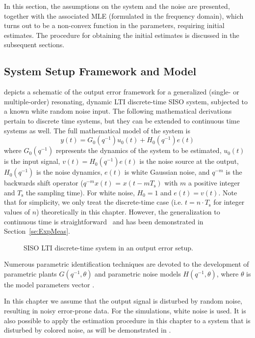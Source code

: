 In this section, the assumptions on the system and the noise are presented, together with the associated MLE (formulated in the frequency domain), which turns out to be a non-convex function in the parameters, requiring initial estimates. The procedure for obtaining the initial estimates is discussed in the subsequent sections.

\subsection{System Setup Framework and Model}
 depicts a schematic of the output error framework for  a generalized (single- or multiple-order) resonating, dynamic LTI discrete-time SISO system, subjected to a known white random noise input. The following mathematical derivations pertain to discrete time systems, but they can be extended to continuous time systems as well. The full mathematical model of the system is
\begin{equation}\label{lpmtd1}
y(t)=G_0(q^{-1})u_0(t)+H_0(q^{-1})e(t)
\end{equation}
where $G_0(q^{-1})$ represents the dynamics of the system to be estimated, $u_0(t)$ is the input signal, $v(t)= H_0(q^{-1})e(t)$ is the noise source at the output, $H_0(q^{-1})$ is the noise dynamics, 
$e(t)$ is white Gaussian noise, and $q^{-m}$ is the backwards shift operator ($q^{-m}x(t)$ = $x(t-mT_{\mathrm{s}})$  with $m$ a positive integer and $T_{\mathrm{s}}$ the sampling time).
For white noise, $H_0 = 1$ and $e(t) = v(t)$.
Note that for simplicity, we only treat the discrete-time case (i.e. $t = n \cdot T_{\mathrm{s}}$ for integer values of $n$) theoretically in this chapter.
However, the generalization to continuous time is straightforward~\citep[Chapter 6]{Pintelon2012} and has been demonstrated in Section~\ref{se:ExpMeas}.

\begin{figure}[tbh] %
\centering

\caption[Output-error set-up.]{SISO LTI discrete-time system in an output error setup.}
\label{fig:oesetup}
\end{figure}

Numerous parametric identification techniques are devoted to the development of parametric plants $G(q^{-1},\theta)$ and parametric noise models  $H(q^{-1},\theta)$, where  $\theta$ is the model parameters vector  \citep{Ljung1999,Soderstrom1989}.

In this chapter we assume that the output signal is disturbed by random noise, resulting in noisy error-prone data.
For the simulations, white noise is used.
It is also possible to apply the estimation procedure in this chapter to a system that is disturbed by colored noise, as will be demonstrated in . 


